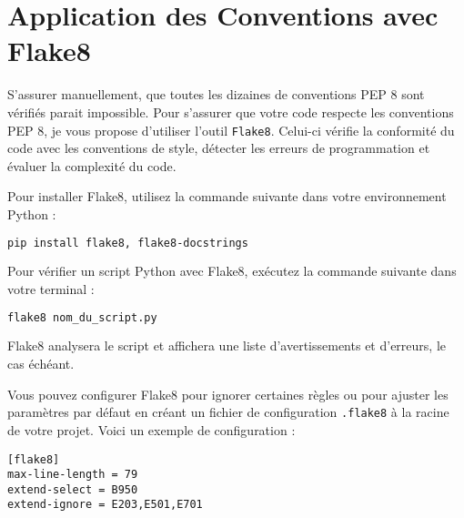 \documentclass[a4paper,12pt]{article}
\begin{document}
\section{Application des Conventions avec Flake8}

S'assurer manuellement, que toutes les dizaines de conventions PEP 8 sont vérifiés parait impossible.  
Pour s'assurer que votre code respecte les conventions PEP 8, je vous propose d'utiliser l'outil \texttt{Flake8}. Celui-ci vérifie la conformité du code avec les conventions de style, détecter les erreurs de programmation et évaluer la complexité du code.

Pour installer Flake8, utilisez la commande suivante dans votre environnement Python :

\begin{lstlisting}[language=bash]
pip install flake8, flake8-docstrings
\end{lstlisting}

Pour vérifier un script Python avec Flake8, exécutez la commande suivante dans votre terminal :

\begin{lstlisting}[language=bash]
flake8 nom_du_script.py
\end{lstlisting}

Flake8 analysera le script et affichera une liste d'avertissements et d'erreurs, le cas échéant.


Vous pouvez configurer Flake8 pour ignorer certaines règles ou pour ajuster les paramètres par défaut en créant un fichier de configuration \texttt{.flake8} à la racine de votre projet. Voici un exemple de configuration :

\begin{lstlisting}
[flake8]
max-line-length = 79
extend-select = B950
extend-ignore = E203,E501,E701
\end{lstlisting}
\end{document}
